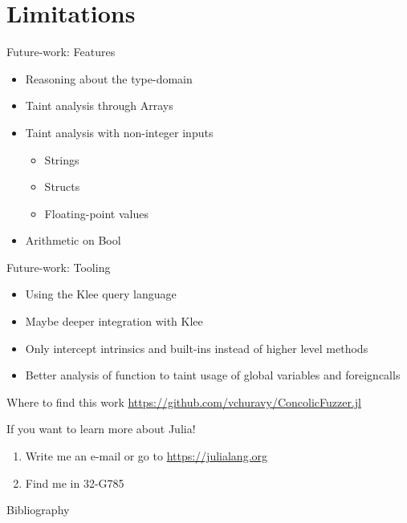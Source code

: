 \documentclass[aspectratio=169]{beamer}
\begin{document}
  \section{Limitations}
  \begin{frame}{Future-work: Features}
      \begin{itemize}[<+->]
          \item Reasoning about the type-domain
          \item Taint analysis through Arrays
          \item Taint analysis with non-integer inputs
            \begin{itemize}
                \item Strings
                \item Structs
                \item Floating-point values
            \end{itemize}
        \item Arithmetic on Bool
      \end{itemize}
  \end{frame}
  \begin{frame}{Future-work: Tooling}
      \begin{itemize}[<+->]
          \item Using the Klee query language
          \item Maybe deeper integration with Klee\cite{Cadar_Dunbar_Engler}
          \item Only intercept intrinsics and built-ins instead of higher
                level methods
          \item Better analysis of function to taint usage of global
                variables and foreigncalls
      \end{itemize}
  \end{frame}
  \begin{frame}
      \begin{block}{Where to find this work}
          \url{https://github.com/vchuravy/ConcolicFuzzer.jl}
      \end{block}
      \pause
      \begin{block}{If you want to learn more about Julia!}
          \begin{enumerate}
              \item Write me an e-mail or go to \url{https://julialang.org}
              \item Find me in 32-G785
            \end{enumerate}
      \end{block}
  \end{frame}
  \begin{frame}[allowframebreaks]{Bibliography}
      \printbibliography
\end{frame}
\end{document}
